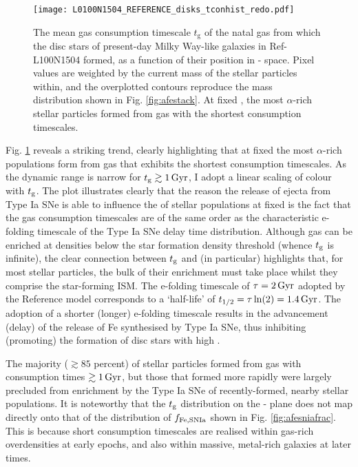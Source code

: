 \begin{figure}
\texttt{[image: L0100N1504\_REFERENCE\_disks\_tconhist\_redo.pdf]}
\caption[Mean gas consumption timescale as a fucntion of \afe{} and \feh{} for disc stars in Ref-L100N1504]{\label{fig:afetcon} The mean gas consumption timescale $t_{\mathrm{g}}$ of the natal gas from which the disc stars of present-day Milky Way-like galaxies in Ref-L100N1504 formed, as a function of their position in \afe{}-\feh{} space.  Pixel values are weighted by the current mass of the stellar particles within, and the overplotted contours reproduce the mass distribution shown in Fig. \ref{fig:afestack}. At fixed \feh{}, the most $\alpha$-rich stellar particles formed from gas with the shortest consumption timescales.}
\end{figure}

Fig. \ref{fig:afetcon} reveals a striking trend, clearly highlighting that at fixed \feh{} the most $\alpha$-rich populations form from gas that exhibits the shortest consumption timescales. As the dynamic range is narrow for $t_{\rm g} \gtrsim 1\,{\rm Gyr}$, I adopt a linear scaling of colour with $t_{\rm g}$. The plot illustrates clearly that the reason the release of ejecta from Type Ia SNe is able to influence the \afe{} of stellar populations at fixed \feh{} is the fact that the gas consumption timescales are of the same order as the characteristic e-folding timescale of the Type Ia SNe delay time distribution. Although gas can be enriched at densities below the star formation density threshold (whence $t_{\rm g}$ is infinite), the clear connection between $t_{\rm g}$ and (in particular) \afe{} highlights that, for most stellar particles, the bulk of their enrichment must take place whilst they comprise the star-forming ISM. The e-folding timescale of $\tau=2\,{\rm Gyr}$ adopted by the Reference model corresponds to a `half-life' of $t_{1/2}=\tau\ln(2)=1.4\,{\rm Gyr}$. The adoption of a shorter (longer) e-folding timescale results in the advancement (delay) of the release of Fe synthesised by Type Ia SNe, thus inhibiting (promoting) the formation of disc stars with high \afe{}. 

The majority ($\gtrsim 85$ percent) of stellar particles formed from gas with consumption times $\gtrsim 1\,{\rm Gyr}$, but those that formed more rapidly were largely precluded from enrichment by the Type Ia SNe of recently-formed, nearby stellar populations. It is noteworthy that the $t_{\rm g}$ distribution on the \afe{}-\feh{} plane does not map directly onto that of the distribution of $f_{\rm Fe,SNIa}$ shown in Fig. \ref{fig:afesniafrac}. This is because short consumption timescales are realised within gas-rich overdensities at early epochs, and also within massive, metal-rich galaxies at later times.

